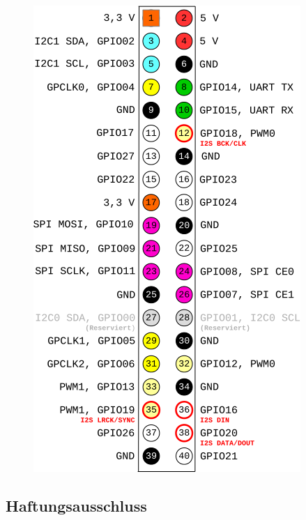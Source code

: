 \begin{figure}[ht]
  \includegraphics[scale=0.65]{images/PinOut-RPi.png}
\end{figure}
\clearpage




\subsection*{Haftungsausschluss}


